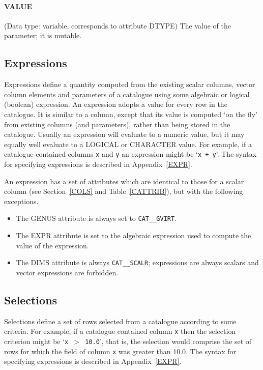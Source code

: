 \documentclass[11pt,twoside]{starlink}
\begin{document}
\paragraph{VALUE}
(Data type: variable, corresponds to attribute DTYPE)
The value of the parameter; it is mutable.


\subsection{Expressions}

Expressions define a quantity computed from the existing scalar columns,
vector column elements and parameters of a catalogue using some
algebraic or logical (boolean) expression. An expression adopts a value
for every row in the catalogue. It is similar to a column, except that
its value is computed `on the fly' from existing columns (and
parameters), rather than being stored in the catalogue. Usually an
expression will evaluate to a numeric value, but it may equally well
evaluate to a LOGICAL or CHARACTER value. For example, if a catalogue
contained columns \texttt{x} and \texttt{y} an expression might be `\texttt{x + y}'. The syntax for specifying expressions is described in
Appendix~\ref{EXPR}.

An expression has a set of attributes which are identical to those for
a scalar column (see Section~\ref{COLS} and Table~\ref{CATTRIB}), but
with the following exceptions.

\begin{itemize}

  \item The GENUS attribute is always set to \texttt{CAT\_\_GVIRT}.

  \item The EXPR attribute is set to the algebraic expression used to
   compute the value of the expression.

  \item The DIMS attribute is always \texttt{CAT\_\_SCALR}; expressions are
   always scalars and vector expressions are forbidden.

\end{itemize}


\subsection{Selections}

Selections define a set of rows selected from a catalogue according to
some criteria. For example, if a catalogue contained column \texttt{x}
then the selection criterion might be `\texttt{x $>$ 10.0}', that is, the
selection would comprise the set of rows for which the field of column
\texttt{x} was greater than 10.0. The syntax for specifying expressions is
described in Appendix~\ref{EXPR}.
\end{document}
